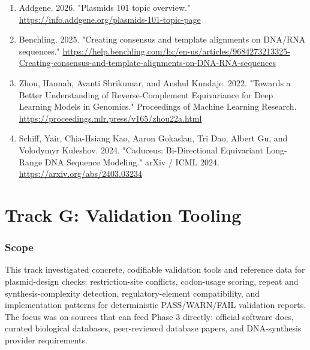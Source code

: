 \documentclass[11pt]{report}
\begin{document}
\begin{enumerate}
\item Addgene. 2026. "Plasmids 101 topic overview." \url{https://info.addgene.org/plasmids-101-topic-page}
\item Benchling. 2025. "Creating consensus and template alignments on DNA/RNA sequences." \url{https://help.benchling.com/hc/en-us/articles/9684273213325-Creating-consensus-and-template-alignments-on-DNA-RNA-sequences}
\item Zhou, Hannah, Avanti Shrikumar, and Anshul Kundaje. 2022. "Towards a Better Understanding of Reverse-Complement Equivariance for Deep Learning Models in Genomics." Proceedings of Machine Learning Research. \url{https://proceedings.mlr.press/v165/zhou22a.html}
\item Schiff, Yair, Chia-Hsiang Kao, Aaron Gokaslan, Tri Dao, Albert Gu, and Volodymyr Kuleshov. 2024. "Caduceus: Bi-Directional Equivariant Long-Range DNA Sequence Modeling." arXiv / ICML 2024. \url{https://arxiv.org/abs/2403.03234}
\end{enumerate}

\chapter{Track G: Validation Tooling}

\subsection{Scope}
This track investigated concrete, codifiable validation tools and reference data for plasmid-design checks: restriction-site conflicts, codon-usage scoring, repeat and synthesis-complexity detection, regulatory-element compatibility, and implementation patterns for deterministic PASS/WARN/FAIL validation reports. The focus was on sources that can feed Phase 3 directly: official software docs, curated biological databases, peer-reviewed database papers, and DNA-synthesis provider requirements.\par
\end{document}
